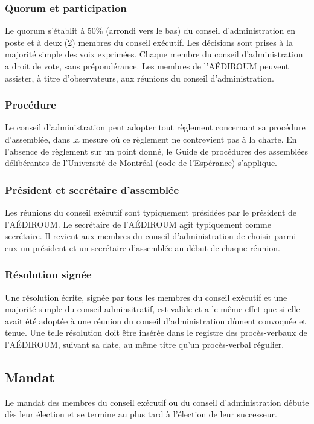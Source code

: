 \documentclass[12pt]{article}
\begin{document}
\subsubsection{Quorum et participation}

Le quorum s'établit à 50\% (arrondi vers le bas) du conseil d'administration en poste et à deux (2) membres du conseil exécutif. Les décisions sont prises à la majorité simple des voix exprimées. Chaque membre du conseil d'administration a droit de vote, sans prépondérance. Les membres de l'AÉDIROUM peuvent assister, à titre d'observateurs, aux réunions du conseil d'administration.

\subsubsection{Procédure}

Le conseil d'administration peut adopter tout règlement concernant sa procédure d'assemblée, dans la mesure où ce règlement ne contrevient pas à la charte. En l'absence de règlement sur un point donné, le Guide de procédures des assemblées délibérantes de l'Université de Montréal (code de l'Espérance) s'applique.

\subsubsection{Président et secrétaire d'assemblée}

Les réunions du conseil exécutif sont typiquement présidées par le président de l'AÉDIROUM. Le secrétaire de l'AÉDIROUM agit typiquement comme secrétaire. Il revient aux membres du conseil d'administration de choisir parmi eux un président et un secrétaire d'assemblée au début de chaque réunion.

\subsubsection{Résolution signée}

Une résolution écrite, signée par tous les membres du conseil exécutif et une majorité simple du conseil adminsitratif, est valide et a le même effet que si elle avait été adoptée à une réunion du conseil d'administration dûment convoquée et tenue. Une telle résolution doit être insérée dans le registre des procès-verbaux de l'AÉDIROUM, suivant sa date, au même titre qu'un procès-verbal régulier.

\subsection{Mandat}
Le mandat des membres du conseil exécutif ou du conseil d'administration débute dès leur élection et se termine au plus tard à l'élection de leur successeur.
\end{document}

